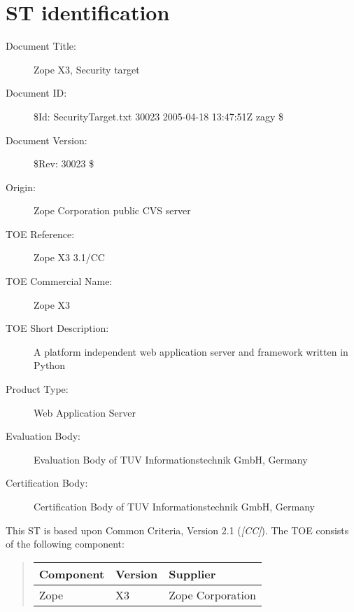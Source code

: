 \documentclass[10pt,a4paper,english]{book}
\newlength{\locallinewidth}
\begin{document}

\hypertarget{st-identification}{}
\section{ST identification}

\begin{description}
\item [Document Title:]
Zope X3, Security target


\item [Document ID:]
{\$}Id: SecurityTarget.txt 30023 2005-04-18 13:47:51Z zagy {\$}


\item [Document Version:]
{\$}Rev: 30023 {\$}


\item [Origin:]
Zope Corporation public CVS server


\item [TOE Reference:]
Zope X3 3.1/CC


\item [TOE Commercial Name:]
Zope X3


\item [TOE Short Description:]
A platform independent web application server and framework written in Python


\item [Product Type:]
Web Application Server


\item [Evaluation Body:]
Evaluation Body of TUV Informationstechnik GmbH, Germany


\item [Certification Body:]
Certification Body of TUV Informationstechnik GmbH, Germany


\end{description}

This ST is based upon Common Criteria, Version 2.1 (\emph{{[}CC]}).
The TOE consists of the following component:
\begin{quote}

\begin{longtable}[c]{|p{0.14\locallinewidth}|p{0.13\locallinewidth}|p{0.20\locallinewidth}|}
\hline
\textbf{
Component
} & \textbf{
Version
} & \textbf{
Supplier
} \\
\hline
\endhead

Zope
 & 
X3
 & 
Zope Corporation
 \\
\hline
\end{longtable}
\end{quote}
\end{document}
